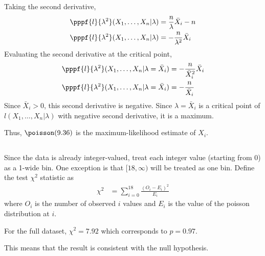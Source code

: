 \documentclass[11pt]{article}
\begin{document}
Taking the second derivative,
\begin{align*}
    \pppf{l}{\lambda^2}(X_1, \dots, X_n | \lambda) &= \frac{n}{\lambda} \bar{X}_i - n \\
    \pppf{l}{\lambda^2}(X_1, \dots, X_n | \lambda) &= - \frac{n}{\lambda^2} \bar{X}_i
\end{align*}
Evaluating the second derivative at the critical point,
\begin{align*}
    \pppf{l}{\lambda^2}(X_1, \dots, X_n | \lambda=\bar{X}_i) &= - \frac{n}{\bar{X}_i^2} \bar{X}_i \\
    \pppf{l}{\lambda^2}(X_1, \dots, X_n | \lambda=\bar{X}_i) &= - \frac{n}{\bar{X}_i}
\end{align*}
Since $\bar{X}_i > 0$, this second derivative is negative. Since $\lambda = \bar{X}_i$
is a critical point of $l(X_1, \dots, X_n | \lambda)$ with negative second derivative,
it is a maximum.
\begin{mdframed}
    Thus, $\poisson(9.36)$ is the maximum-likelihood estimate of $X_i$.
\end{mdframed}

\subsection{}  %

Since the data is already integer-valued, treat each integer value (starting from 0)
as a 1-wide bin. One exception is that $[18, \infty)$ will be treated as one bin.
Define the test $\chi^2$ statistic as
\begin{align*}
    \chi^2 &= \sum_{i=0}^{18} \frac{\left(O_i - E_i\right)^2}{E_i}
\end{align*}
where $O_i$ is the number of observed $i$ values and $E_i$ is the value of the
poisson distribution at $i$.
\begin{mdframed}
    For the full dataset, $\chi^2=7.92$ which corresponds to $p=0.97$.
\end{mdframed}
This means that the result is consistent with the null hypothesis.
\end{document}

